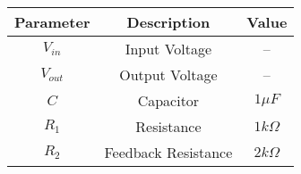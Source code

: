 \begin{tabular}{|c|c|c|}
      \hline
      Parameter & Description & Value\\\hline
      $V_{in}$ & Input Voltage & --\\\hline
      $V_{out}$ & Output Voltage & --\\\hline
      $C$ & Capacitor & $1\mu F$\\\hline
      $R_1$ & Resistance & $1k\Omega$\\\hline
      $R_2$ & Feedback Resistance & $2k\Omega$\\\hline
\end{tabular}
